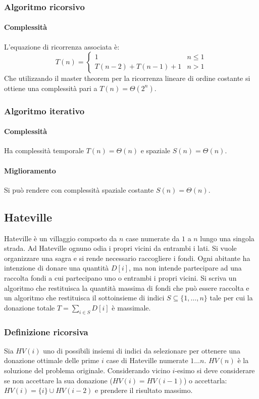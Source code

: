 \subsubsection{Algoritmo ricorsivo}

\paragraph{Complessit\`a}
L'equazione di ricorrenza associata \`e:
$$
T(n)=
\begin{cases}
1\quad & n\le 1\\
T(n-2) + T(n-1) + 1& n>1
\end{cases}
$$
Che utilizzando il master theorem per la ricorrenza lineare di ordine costante si ottiene una complessit\`a pari a $T(n)=\Theta(2^n)$.
\subsubsection{Algoritmo iterativo}

\paragraph{Complessit\`a}
Ha complessit\`a temporale $T(n)=\Theta(n)$ e spaziale $S(n)=\Theta(n)$.
\paragraph{Miglioramento}
Si pu\`o rendere con complessit\`a spaziale costante $S(n)=\Theta(n)$.

\subsection{Hateville}
Hateville \`e un villaggio composto da $n$ case numerate da $1$ a $n$ lungo una singola strada. Ad Hateville ognuno odia i propri vicini da entrambi i lati. Si vuole organizzare una sagra e si rende necessario
raccogliere i fondi. Ogni abitante ha intenzione di donare una quantit\`a $D[i]$, ma non intende partecipare ad una raccolta fondi a cui partecipano uno o entrambi i propri vicini. Si scriva un algoritmo che 
restituisca la quantit\`a massima di fondi che pu\`o essere raccolta e un algoritmo che restituisca il sottoinsieme di indici $S\subseteq\{1, \dots, n\}$ tale per cui la donazione totale $T=\sum\limits_{i\in S}D[i]$
\`e massimale.
\subsubsection{Definizione ricorsiva}
Sia $HV(i)$ uno di possibili insiemi di indici da selezionare per ottenere una donazione ottimale delle prime $i$ case di Hateville numerate $1\dots n$. $HV(n)$ \`e la soluzione del problema originale. 
Considerando vicino $i$-esimo si deve considerare se non accettare la sua donazione ($HV(i)=HV(i-1)$) o accettarla: $HV(i) = \{i\}\cup HV(i-2)$ e prendere il risultato massimo. 
